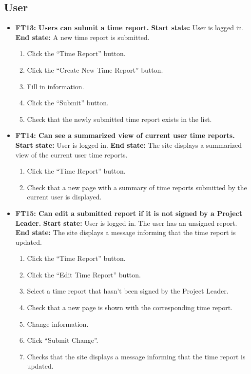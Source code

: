 \documentclass{article}
\begin{document}
\subsection{User}
\begin{itemize}
		\item \textbf{FT13: Users can submit a time report.}\newline
		\textbf{Start state:} User is logged in. \newline
		\textbf{End state:} A new time report is submitted.
		\begin{enumerate}
			\item Click the “Time Report” button.
			\item Click the “Create New Time Report” button.
			\item Fill in information.
			\item Click the “Submit” button.
			\item Check that the newly submitted time report exists in the list.
		\end{enumerate}
		
		\item \textbf{FT14: Can see a summarized view of current user time reports.}\newline
		\textbf{Start state:} User is logged in.  \newline
		\textbf{End state:} The site displays a summarized view of the current user time reports.
		\begin{enumerate}
			\item Click the “Time Report” button.
			\item Check that a new page with a summary of time reports submitted by the current user is displayed.
		\end{enumerate}
		
		\item \textbf{FT15: Can edit a submitted report if it is not signed by a Project Leader.}\newline
		\textbf{Start state:} User is logged in. The user has an unsigned report. \newline
		\textbf{End state:} The site displays a message informing that the time report is updated.
		\begin{enumerate}
			\item Click the “Time Report” button.
			\item Click the “Edit Time Report” button.
			\item Select a time report that hasn’t been signed by the Project Leader.
			\item Check that a new page is shown with the corresponding time report.	
			\item Change information.
			\item Click “Submit Change”.
			\item Checks that the site displays a message informing that the time report is updated.
		\end{enumerate}
		

\end{itemize}
\end{document}
